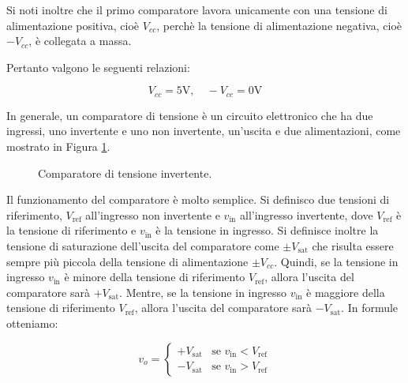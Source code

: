 \documentclass[a4paper,12pt]{report}  %
\begin{document}
Si noti inoltre che il primo comparatore lavora unicamente con una tensione di alimentazione positiva, cioè $V_{cc}$, perchè la tensione di alimentazione negativa, cioè $-V_{cc}$, è collegata a massa.

Pertanto valgono le seguenti relazioni:

\begin{equation}
    V_{cc} = 5 \text{V}, \quad -V_{cc} = 0 \text{V} \nonumber
\end{equation}

In generale, un comparatore di tensione è un circuito elettronico che ha due ingressi, uno invertente e uno non invertente, un'uscita e due alimentazioni, come mostrato in Figura \ref{fig:comparatore_invertente}.

\begin{figure}[h]
    \centering
    \caption{Comparatore di tensione invertente.}
    \label{fig:comparatore_invertente}
\end{figure}

Il funzionamento del comparatore è molto semplice.
Si definisco due tensioni di riferimento, $V_{\text{ref}}$ all'ingresso non invertente e $v_{\text{in}}$ all'ingresso invertente, dove $V_{\text{ref}}$ è la tensione di riferimento e $v_{\text{in}}$ è la tensione in ingresso.
Si definisce inoltre la tensione di saturazione dell'uscita del comparatore come $\pm V_{\text{sat}}$ che risulta essere sempre più piccola della tensione di alimentazione $\pm V_{cc}$.
Quindi, se la tensione in ingresso $v_{\text{in}}$ è minore della tensione di riferimento $V_{\text{ref}}$, allora l'uscita del comparatore sarà $+V_{\text{sat}}$.
Mentre, se la tensione in ingresso $v_{\text{in}}$ è maggiore della tensione di riferimento $V_{\text{ref}}$, allora l'uscita del comparatore sarà $-V_{\text{sat}}$.
In formule otteniamo:

\begin{equation}
    v_{o} = \begin{cases}
        +V_{\text{sat}} & \text{se } v_{\text{in}} < V_{\text{ref}} \\
        -V_{\text{sat}} & \text{se } v_{\text{in}} > V_{\text{ref}}
    \end{cases} \label{eq:comparatore}
\end{equation}
\end{document}
